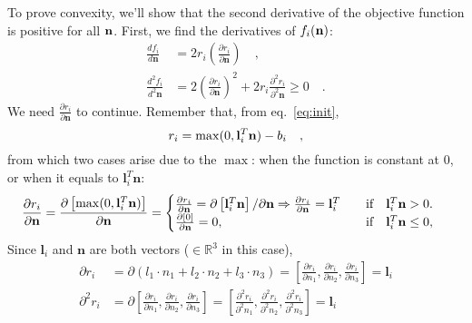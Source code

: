 To prove convexity, we'll show that the second derivative of the objective function is positive for all ${\bf n}$. First, we find the derivatives of $f_i({\bf n})$:
\begin{align}
\frac{df_i}{d\mathbf{n}} &= 2r_i \left( \frac{\partial r_i}{\partial \mathbf{n}} \right) \quad, \label{eq:firstder}\\
\frac{d^2f_i}{d^2\mathbf{n}} &= 2\left(\frac{\partial r_i}{\partial \mathbf{n}}\right)^2 + 2r_i \frac{\partial ^2 r_i}{\partial ^2 \mathbf{n}} \geq 0 \quad \label{eq:secder}.
\end{align}
We need $\frac{\partial r_i}{\partial \mathbf{n}}$ to continue. Remember that, from eq.~\eqref{eq:init},
\begin{equation}
r_i = \max( 0, \mathbf{l}_i^T \mathbf{n} ) - b_i\\
\quad,
\end{equation}
from which two cases arise due to the $\max$: when the function is constant at 0, or when it equals to $\mathbf{l}_i^T \mathbf{n}$:
\begin{equation}
\frac{\partial r_i}{\partial \mathbf{n}} = \frac{\partial \left[ \max(0, \mathbf{l}_i^T \mathbf{n}) \right]}{\partial \mathbf{n}}  = 
\begin{cases}
\frac{\partial r_i}{\partial \mathbf{n}} = \partial \left[ \mathbf{l}_i^T \mathbf{n} \right]/\partial \mathbf{n} \Rightarrow  \frac{\partial r_i}{\partial \mathbf{n}} = \mathbf{l}_i^T \qquad \text{if} \quad \mathbf{l}_i^T \mathbf{n} > 0        . \\
\frac{\partial [0]}{\partial \mathbf{n}} = 0, \hfill \text{if} \quad \mathbf{l}_i^T \mathbf{n} \leq 0,
\end{cases}\\
\end{equation}
Since $\mathbf{l}_i$ and $\mathbf{n}$ are both vectors ($\in \mathbb{R}^3$ in this case),
\begin{align}
\partial r_i &= \partial(l_1 \cdot n_1 + l_2 \cdot n_2 + l_3 \cdot n_3) = \left[ \frac{\partial r_i}{\partial n_1}, \frac{\partial r_i}{\partial n_2}, \frac{\partial r_i}{\partial n_3} \right] = \mathbf{l}_i \\
\partial^2 r_i &= \partial\left[ \frac{\partial r_i}{\partial n_1}, \frac{\partial r_i}{\partial n_2}, \frac{\partial r_i}{\partial n_3} \right] = \left[ \frac{\partial ^2 r_i}{\partial ^2 n_1}, \frac{\partial ^2 r_i}{\partial ^2 n_2}, \frac{\partial ^2 r_i}{\partial ^2 n_3} \right] = \mathbf{l}_i \\
\end{align}
